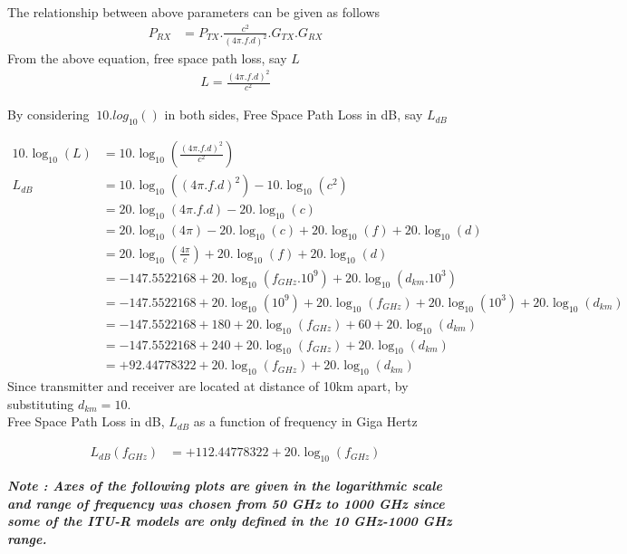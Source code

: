 \documentclass[a4paper,11pt]{article}%
\begin{document}
The relationship between above parameters can be given as follows
\[
\begin{split}
P_{RX} & = P_{TX}.\frac{c^2}{(4\pi.f.d)^2}.G_{TX}.G_{RX}
\end{split}
\]
From the above equation, free space path loss, say $L$
\[
\begin{split}
L = \frac{(4\pi.f.d)^2}{c^2}
\end{split}
\]

By considering $\ 10.log_{10}()$ in both sides, Free Space Path Loss in dB, say $L_{dB}$

\[
\begin{split}
10.\log_{10}(L) &= 10.\log_{10}(\frac{(4\pi.f.d)^2}{c^2})\\
L_{dB}& = 10.\log_{10}((4\pi.f.d)^2) - 10.\log_{10}(c^2)\\
&=20.\log_{10}(4\pi.f.d)-20.\log_{10}(c)\\
&=20.\log_{10}(4\pi)-20.\log_{10}(c) + 20.\log_{10}(f) + 20.\log_{10}(d)\\
&=20.\log_{10}(\frac{4\pi}{c}) + 20.\log_{10}(f) + 20.\log_{10}(d)\\
&= -147.5522168 + 20.\log_{10}(f_{GHz}.10^9) + 20.\log_{10}(d_{km}.10^3)\\
& = -147.5522168 + 20.\log_{10}(10^9)+ 20.\log_{10}(f_{GHz}) + 20.\log_{10}(10^3) + 20.\log_{10}(d_{km})\\
&= -147.5522168 + 180+ 20.\log_{10}(f_{GHz}) + 60 + 20.\log_{10}(d_{km})\\
&= -147.5522168 + 240+ 20.\log_{10}(f_{GHz}) + 20.\log_{10}(d_{km})\\
&= +92.44778322+20.\log_{10}(f_{GHz}) + 20.\log_{10}(d_{km})
\end{split}
\]
Since transmitter and receiver are located at distance of 10km apart, by substituting $d_{km}= 10$.\\

Free Space Path Loss in dB, $L_{dB}$ as a function of frequency in Giga Hertz

\[
\begin{split}
L_{dB}(f_{GHz})&=  +112.44778322+20.\log_{10}(f_{GHz})
\end{split}
\]

\textbf{\textit{Note : Axes of the following plots are given in the logarithmic scale and range of frequency was chosen from 50 GHz to 1000 GHz since some of the ITU-R models are only defined in the 10 GHz-1000 GHz range.}}
\end{document}
